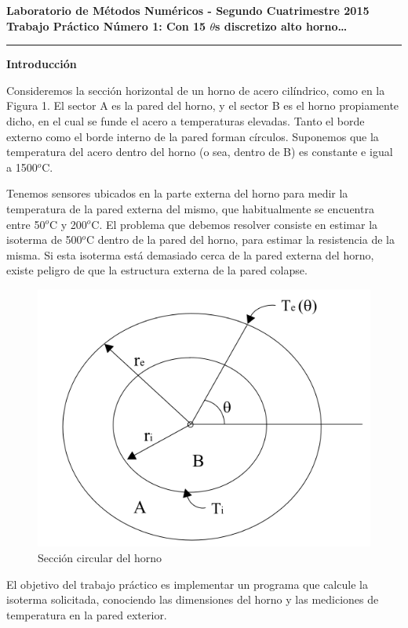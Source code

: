 
\begin{centering}
\bf Laboratorio de M\'etodos Num\'ericos - Segundo Cuatrimestre 2015 \\
\bf Trabajo Pr\'actico N\'umero 1: Con 15 $\theta$s discretizo alto horno\ldots\\
\end{centering}

\vskip 25pt
\hrule
\vskip 11pt

{\bf Introducción}

Consideremos la secci\'on horizontal de un horno de acero cil\'indrico, como en la Figura 1. El sector A es la pared del horno, y el sector B es el horno propiamente dicho, en el cual se funde el acero a temperaturas elevadas. Tanto el borde externo como el borde interno de la pared forman c\'irculos. Suponemos que la temperatura del acero dentro del horno (o sea, dentro de B) es constante e igual a 1500$^{o}$C.

\medskip

Tenemos sensores ubicados en la parte externa del horno para medir la temperatura de la pared externa del mismo, que habitualmente se encuentra entre 50$^{o}$C y 200$^{o}$C. El problema que debemos resolver consiste en estimar la isoterma de 500$^{o}$C dentro de la pared del horno, para estimar la resistencia de la misma. Si esta isoterma est\'a demasiado cerca de la pared externa del horno, existe peligro de que la estructura externa de la pared colapse.


\begin{figure}[ht]
\begin{center}
\includegraphics[width=0.6\columnwidth]{img/Horno.png}
\caption{Secci\'on circular del horno}
\end{center}
\end{figure}



El objetivo del trabajo práctico es implementar un programa que calcule la isoterma solicitada, conociendo las dimensiones del horno y las mediciones de temperatura en la pared exterior.

